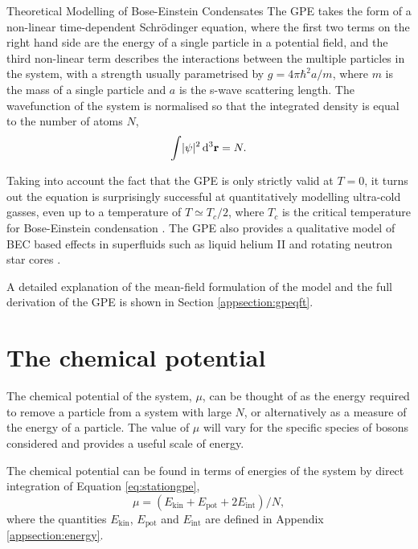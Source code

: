 \begin{chapter}{\label{cha:theoretical_model}Theoretical Modelling of Bose-Einstein Condensates}
The GPE takes the form of a non-linear time-dependent Schr\"odinger equation, where the first two terms on the right hand side are the energy of a single particle in a potential field, and the third non-linear term describes the interactions between the multiple particles in the system, with a strength usually parametrised by $g=4\pi\hbar^2a/m$,
where $m$ is the mass of a single particle and $a$ is the s-wave scattering length. The wavefunction of the system is normalised so that the integrated density is equal to the number of atoms $N$,
\begin{equation}
\int\!|\psi|^2\,{\rm d}^3{\bf r} = N.
\label{eq:normalisewf}
\end{equation}

Taking into account the fact that the GPE is only strictly valid at $T=0$, it turns out the equation is surprisingly successful at quantitatively modelling ultra-cold gasses, even up to a temperature of $T\simeq T_c/2$, where $T_c$ is the critical temperature for Bose-Einstein condensation \cite{Proukakis}. The GPE also provides a qualitative model of BEC based effects in superfluids such as liquid helium II \cite{RobertsBerloff} and rotating neutron star cores \cite{Warszawski01082011}.

A detailed explanation of the mean-field formulation of the model and the full derivation of the GPE is shown in Section \ref{appsection:gpeqft}.

\section{\label{section:mu} The chemical potential}
 The chemical potential of the system, $\mu$, can be thought of as the energy required to remove a particle from a system with large $N$, or alternatively as a measure of the energy of a particle. The value of $\mu$ will vary for the specific species of bosons considered and provides a useful scale of energy.
 
 The chemical potential can be found in terms of energies of the system by direct integration of Equation \ref{eq:stationgpe},
 	\begin{equation}\label{eq:chempot}
 		\mu = \left ( E_{\mathrm{kin}} + E_{\mathrm{pot}} + 2E_{\mathrm{int}} \right ) / N,
 	\end{equation}
 	where the quantities $E_{\mathrm{kin}}$, $E_{\mathrm{pot}}$ and $E_{\mathrm{int}}$ are defined in Appendix \ref{appsection:energy}.


\end{chapter}
